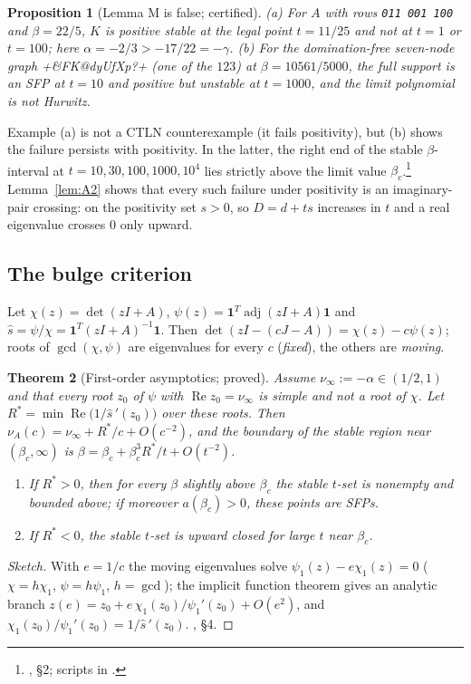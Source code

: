 \documentclass[11pt]{article}
\newtheorem{theorem}{Theorem}[section]
\newtheorem{proposition}[theorem]{Proposition}
\theoremstyle{definition}
\newcommand{\one}{\mathbf{1}}
\newcommand{\adj}{\operatorname{adj}}
\newcommand{\Rea}{\operatorname{Re}}
\begin{document}
\begin{proposition}[Lemma M is false; certified]\label{prop:Mfalse}
(a) For $A$ with rows \texttt{011 001 100} and $\beta=22/5$, $K$ is positive stable at the legal point $t=11/25$ and not at
$t=1$ or $t=100$; here $\alpha=-2/3>-17/22=-\gamma$.
(b) For the domination-free seven-node graph \dsix+&FK@dyUfXp?+ (one of the $123$) at $\beta=10561/5000$, the full support is
an SFP at $t=10$ and positive but unstable at $t=1000$, and the limit polynomial is not Hurwitz.
\end{proposition}
Example (a) is not a CTLN counterexample (it fails positivity), but (b) shows the failure persists with positivity. In the
latter, the right end of the stable $\beta$-interval at $t=10,30,100,1000,10^4$ lies strictly above the limit value
$\beta_c$.\footnote{, \S2; scripts in .}
Lemma~\ref{lem:A2} shows that every such failure under positivity is an imaginary-pair crossing: on the positivity set
$s>0$, so $D=d+ts$ increases in $t$ and a real eigenvalue crosses $0$ only upward.

\subsection{The bulge criterion}
Let $\chi(z)=\det(zI+A)$, $\psi(z)=\one^T\adj(zI+A)\one$ and $\hat s=\psi/\chi=\one^T(zI+A)^{-1}\one$. Then
$\det(zI-(cJ-A))=\chi(z)-c\psi(z)$; roots of $\gcd(\chi,\psi)$ are eigenvalues for every $c$ (\emph{fixed}), the others are
\emph{moving}.

\begin{theorem}[First-order asymptotics; proved]\label{thm:AS}
Assume $\nu_\infty:=-\alpha\in(1/2,1)$ and that every root $z_0$ of $\psi$ with $\Rea z_0=\nu_\infty$ is simple and not a root of
$\chi$. Let $R^*=\min\Rea\bigl(1/\hat s\,'(z_0)\bigr)$ over these roots. Then $\nu_A(c)=\nu_\infty+R^*/c+O(c^{-2})$, and the
boundary of the stable region near $(\beta_c,\infty)$ is $\beta=\beta_c+\beta_c^3R^*/t+O(t^{-2})$.
\begin{enumerate}
\item[(a)] If $R^*>0$, then for every $\beta$ slightly above $\beta_c$ the stable $t$-set is nonempty and bounded above; if
moreover $a(\beta_c)>0$, these points are SFPs.
\item[(b)] If $R^*<0$, the stable $t$-set is upward closed for large $t$ near $\beta_c$.
\end{enumerate}
\end{theorem}
\begin{proof}[Sketch]
With $e=1/c$ the moving eigenvalues solve $\psi_1(z)-e\chi_1(z)=0$ ($\chi=h\chi_1$, $\psi=h\psi_1$, $h=\gcd$); the implicit function
theorem gives an analytic branch $z(e)=z_0+e\,\chi_1(z_0)/\psi_1'(z_0)+O(e^2)$, and $\chi_1(z_0)/\psi_1'(z_0)=1/\hat s\,'(z_0)$.
, \S4.
\end{proof}
\end{document}
